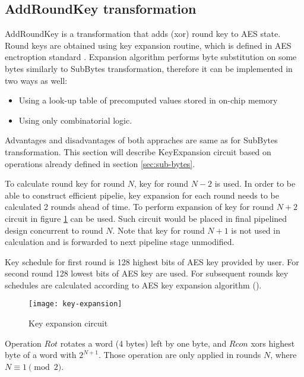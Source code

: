 \subsection{AddRoundKey transformation}

AddRoundKey is a transformation that adds (xor) round key to AES state. Round keys are obtained using key expansion routine, which is defined in AES enctroption standard \cite{aes-standard}. Expansion algorithm performs byte substitution on some bytes similarly to SubBytes transformation, therefore it can be implemented in two ways as well:

\begin{itemize}[nolistsep]
\item Using a look-up table of precomputed values stored in on-chip memory
\item Using only combinatorial logic.
\end{itemize}

Advantages and disadvantages of both appraches are same as for SubBytes transformation. This section will describe KeyExpansion circuit based on operations already defined in section \ref{sec:sub-bytes}.

To calculate round key for round $N$, key for round $N - 2$ is used. In order to be able to construct efficient pipelie, key expansion for each round needs to be calculated 2 rounds ahead of time. To perform expansion of key for round $N + 2$ circuit in figure \ref{fig:key-expansion} can be used. Such circuit would be placed in final pipelined design concurrent to round $N$. Note that key for round $N + 1$ is not used in calculation and is forwarded to next pipeline stage unmodified.

Key schedule for first round is 128 highest bits of AES key provided by user. For second round 128 lowest bits of AES key are used. For subsequent rounds key schedules are calculated according to AES key expansion algorithm (\cite{aes-standard}).

\begin{figure}[!h]
\centering
\texttt{[image: key-expansion]}
\caption{Key expansion circuit}
\label{fig:key-expansion}
\end{figure}

Operation $Rot$ rotates a word (4 bytes) left by one byte, and $Rcon$ xors highest byte of a word with $2^{N + 1}$. Those operation are only applied in rounds $N$, where $N \equiv 1 \pmod{2}$.

